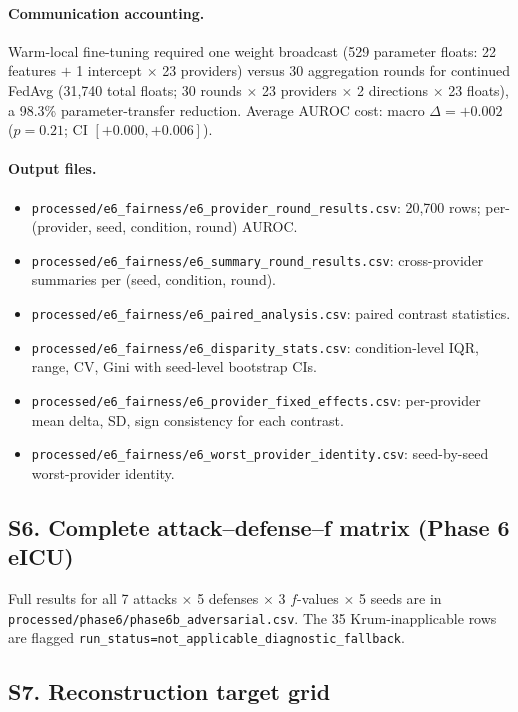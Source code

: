 \paragraph{Communication accounting.}
Warm-local fine-tuning required one weight broadcast
(529 parameter floats: 22 features $+$ 1 intercept $\times$ 23 providers)
versus 30 aggregation rounds for continued FedAvg (31{,}740 total floats;
30 rounds $\times$ 23 providers $\times$ 2 directions $\times$ 23 floats),
a 98.3\% parameter-transfer reduction.
Average AUROC cost: macro $\Delta=+0.002$ ($p=0.21$; CI $[+0.000, +0.006]$).

\paragraph{Output files.}
\begin{itemize}
  \item \texttt{processed/e6\_fairness/e6\_provider\_round\_results.csv}:
    20,700 rows; per-(provider, seed, condition, round) AUROC.
  \item \texttt{processed/e6\_fairness/e6\_summary\_round\_results.csv}:
    cross-provider summaries per (seed, condition, round).
  \item \texttt{processed/e6\_fairness/e6\_paired\_analysis.csv}:
    paired contrast statistics.
  \item \texttt{processed/e6\_fairness/e6\_disparity\_stats.csv}:
    condition-level IQR, range, CV, Gini with seed-level bootstrap CIs.
  \item \texttt{processed/e6\_fairness/e6\_provider\_fixed\_effects.csv}:
    per-provider mean delta, SD, sign consistency for each contrast.
  \item \texttt{processed/e6\_fairness/e6\_worst\_provider\_identity.csv}:
    seed-by-seed worst-provider identity.
\end{itemize}

\subsection*{S6. Complete attack--defense--f matrix (Phase 6 eICU)}

Full results for all 7 attacks $\times$ 5 defenses $\times$ 3 $f$-values
$\times$ 5 seeds are in \texttt{processed/phase6/phase6b\_adversarial.csv}.
The 35 Krum-inapplicable rows are flagged
\texttt{run\_status=not\_applicable\_diagnostic\_fallback}.

\subsection*{S7. Reconstruction target grid}

